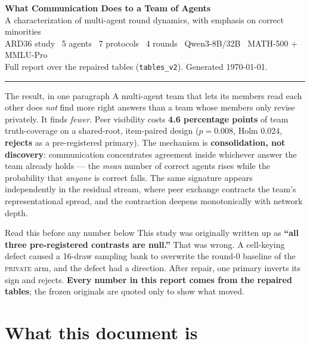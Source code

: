 \documentclass[11pt]{article}
\newcommand{\rej}{\textcolor{alert}{\textbf{rejects}}}
\begin{document}
\begin{center}
{\LARGE\bfseries\sffamily What Communication Does to a Team of Agents}\\[4pt]
{\large\sffamily A characterization of multi-agent round dynamics, with emphasis on correct minorities}\\[10pt]
{\small\sffamily ARD36 study \textbullet\ 5 agents \textbullet\ 7 protocols \textbullet\ 4 rounds \textbullet\ Qwen3-8B/32B \textbullet\ MATH-500 + MMLU-Pro}\\[3pt]
{\footnotesize\color{muted}\sffamily Full report over the repaired tables (\texttt{tables\_v2}). Generated \today.}
\end{center}

\vspace{4pt}
\hrule
\vspace{10pt}

\begin{takeaway}{The result, in one paragraph}
A multi-agent team that lets its members read each other does \emph{not} find more right answers
than a team whose members only revise privately. It finds \emph{fewer}. Peer visibility costs
\textbf{4.6 percentage points} of team truth-coverage on a shared-root, item-paired design
(\(p=0.008\), Holm \(0.024\), \rej{} as a pre-registered primary). The mechanism is
\textbf{consolidation, not discovery}: communication concentrates agreement inside whichever
answer the team already holds --- the \emph{mean} number of correct agents rises while the
probability that \emph{anyone} is correct falls. The same signature appears independently in the
residual stream, where peer exchange contracts the team's representational spread, and the
contraction deepens monotonically with network depth.
\end{takeaway}

\vspace{2pt}

\begin{caution}{Read this before any number below}
This study was originally written up as \textbf{``all three pre-registered contrasts are null.''}
That was wrong. A cell-keying defect caused a 16-draw sampling bank to overwrite the round-0
baseline of the \textsc{private} arm, and the defect had a direction. After repair, one primary
inverts its sign and rejects. \textbf{Every number in this report comes from the repaired tables};
the frozen originals are quoted only to show what moved.
\end{caution}

\section{What this document is}
\end{document}
